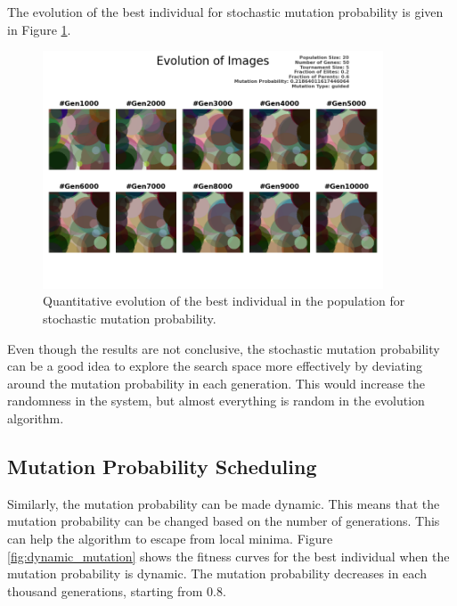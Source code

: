 \documentclass{assignment}
\begin{document}
The evolution of the best individual for stochastic mutation probability is given in Figure \ref{fig:stochastic_mutation_image}.
\begin{figure}[!htb]
    \centering
    \includegraphics[width=0.9\textwidth]{figures/images_outputSTOC_20_50_5_0.2_0.6_0.21864011617446064_guided.png}
    \caption{Quantitative evolution of the best individual in the population for stochastic mutation probability.}
    \label{fig:stochastic_mutation_image}
\end{figure}

Even though the results are not conclusive, the stochastic mutation probability can be a good idea to explore the search space more effectively by deviating around the mutation probability in each generation. This would increase the randomness in the system, but almost everything is random in the evolution algorithm.

\subsection{Mutation Probability Scheduling}
Similarly, the mutation probability can be made dynamic. This means that the mutation probability can be changed based on the number of generations. This can help the algorithm to escape from local minima. Figure \ref{fig:dynamic_mutation} shows the fitness curves for the best individual when the mutation probability is dynamic. The mutation probability decreases in each thousand generations, starting from 0.8.
\end{document}
